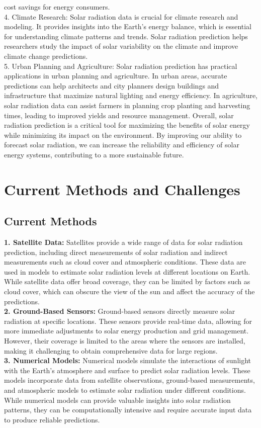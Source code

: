 \documentclass[12pt,a4paper]{report}
\begin{document}
cost savings for energy consumers.\\
4. Climate Research: Solar radiation data is crucial for climate research and modeling. 
It provides insights into the Earth's energy balance, which is essential for understanding 
climate patterns and trends. Solar radiation prediction helps researchers study the impact 
of solar variability on the climate and improve climate change predictions.\\
5. Urban Planning and Agriculture: Solar radiation prediction has practical 
applications in urban planning and agriculture. In urban areas, accurate predictions can 
help architects and city planners design buildings and infrastructure that maximize 
natural lighting and energy efficiency. In agriculture, solar radiation data can assist 
farmers in planning crop planting and harvesting times, leading to improved yields and 
resource management.
Overall, solar radiation prediction is a critical tool for maximizing the benefits of solar 
energy while minimizing its impact on the environment. By improving our ability to 
forecast solar radiation, we can increase the reliability and efficiency of solar energy 
systems, contributing to a more sustainable future.
\section{Current Methods and Challenges}
\subsection{Current Methods}
\textbf{1. Satellite Data:} Satellites provide a wide range of data for solar radiation prediction, 
including direct measurements of solar radiation and indirect measurements such as 
cloud cover and atmospheric conditions. These data are used in models to estimate solar 
radiation levels at different locations on Earth. While satellite data offer broad coverage, 
they can be limited by factors such as cloud cover, which can obscure the view of the 
sun and affect the accuracy of the predictions.\\
\textbf{2. Ground-Based Sensors:} Ground-based sensors directly measure solar radiation at 
specific locations. These sensors provide real-time data, allowing for more immediate 
adjustments to solar energy production and grid management. However, their coverage 
is limited to the areas where the sensors are installed, making it challenging to obtain 
comprehensive data for large regions.\\
\textbf{3. Numerical Models:} Numerical models simulate the interactions of sunlight with the 
Earth's atmosphere and surface to predict solar radiation levels. These models 
incorporate data from satellite observations, ground-based measurements, and 
atmospheric models to estimate solar radiation under different conditions. While 
numerical models can provide valuable insights into solar radiation patterns, they can be 
computationally intensive and require accurate input data to produce reliable 
predictions.
\end{document}
